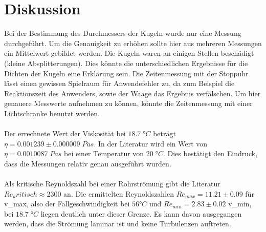 \section{Diskussion}
\label{sec:Diskussion}
Bei der Bestimmung des Durchmessers der Kugeln wurde nur eine Messung durchgeführt. Um die Genauigkeit zu erhöhen sollte hier aus mehreren Messungen ein Mittelwert 
gebildet werden. Die Kugeln waren an einigen Stellen beschädigt (kleine Absplitterungen). Dies könnte die unterschiedlichen Ergebnisse für die Dichten der Kugeln eine Erklärung sein.
Die Zeitenmessung mit der Stoppuhr lässt einen gewissen Spielraum für Anwendefehler zu, da zum Beispiel die Reaktionszeit des Anwenders, sowie der Waage das Ergebnis verfälschen.
Um hier genauere Messwerte aufnehmen zu können, könnte die Zeitenmessung mit einer Lichtschranke benutzt werden.
\\
\\
Der errechnete Wert der Viskosität bei $18.7\;\unit{°C}$ beträgt $\eta = 0.001239\pm0.000009\;\unit{Pas}$. In der Literatur wird ein Wert von $\eta = 0.0010087\;\unit{Pas}$ bei einer
Temperatur von $20\;\unit{°C}$. Dies bestätigt den Eindruck, dass die Messungen relativ genau ausgeführt wurden. 
\\
\\
Als kritische Reynoldszahl bei einer Rohrströmung gibt die Literatur $Re_kritisch \approx 2300$ an. Die ermittelten Reynoldszahlen $Re_{max} = 11.21 \pm 0.09$ für v_{max}, also der Fallgeschwindigkeit
bei $56\unit{°C}$ und $Re_{min} = 2.83 \pm 0.02$ v_{min}, bei $18.7\;\unit{°C}$ liegen deutlich unter dieser Grenze. Es kann davon ausgegangen werden, dass die Strömung laminar ist und keine 
Turbulenzen auftreten. 